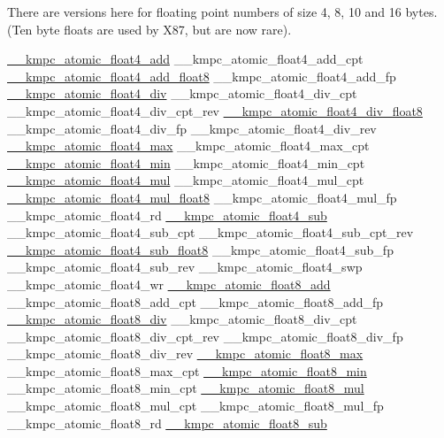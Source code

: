 There are versions here for floating point numbers of size 4, 8, 10 and 16 bytes. (Ten byte floats are used by X87, but are now rare). 
\begin{DoxyCode}
\hyperlink{kmp__atomic_8h_a486e892588a8765e61a869c39abce441}{\_\_kmpc\_atomic\_float4\_add}
\_\_kmpc\_atomic\_float4\_add\_cpt
\hyperlink{kmp__atomic_8h_a59632da2a647b4c6f8590f5bd0d80613}{\_\_kmpc\_atomic\_float4\_add\_float8}
\_\_kmpc\_atomic\_float4\_add\_fp
\hyperlink{kmp__atomic_8h_aed85e1b7130f883d993cdab037efc51d}{\_\_kmpc\_atomic\_float4\_div}
\_\_kmpc\_atomic\_float4\_div\_cpt
\_\_kmpc\_atomic\_float4\_div\_cpt\_rev
\hyperlink{kmp__atomic_8h_a8d63a56b5f7abc38a0b6dfaa315d60bc}{\_\_kmpc\_atomic\_float4\_div\_float8}
\_\_kmpc\_atomic\_float4\_div\_fp
\_\_kmpc\_atomic\_float4\_div\_rev
\hyperlink{kmp__atomic_8h_adb68ad8ccf01bd41f130bc38260454a6}{\_\_kmpc\_atomic\_float4\_max}
\_\_kmpc\_atomic\_float4\_max\_cpt
\hyperlink{kmp__atomic_8h_a416c90256aa4d78b48ccef7ced47b9af}{\_\_kmpc\_atomic\_float4\_min}
\_\_kmpc\_atomic\_float4\_min\_cpt
\hyperlink{kmp__atomic_8h_afddefd621f62ee0ec603031a6a83def4}{\_\_kmpc\_atomic\_float4\_mul}
\_\_kmpc\_atomic\_float4\_mul\_cpt
\hyperlink{kmp__atomic_8h_aa152347bbdc07e4959a9a2a6fc6c6904}{\_\_kmpc\_atomic\_float4\_mul\_float8}
\_\_kmpc\_atomic\_float4\_mul\_fp
\_\_kmpc\_atomic\_float4\_rd
\hyperlink{kmp__atomic_8h_a12d9b6940ecaeba04d2b6648f57ca4fb}{\_\_kmpc\_atomic\_float4\_sub}
\_\_kmpc\_atomic\_float4\_sub\_cpt
\_\_kmpc\_atomic\_float4\_sub\_cpt\_rev
\hyperlink{kmp__atomic_8h_a8fb8b665be66e153854ae703a187f3a3}{\_\_kmpc\_atomic\_float4\_sub\_float8}
\_\_kmpc\_atomic\_float4\_sub\_fp
\_\_kmpc\_atomic\_float4\_sub\_rev
\_\_kmpc\_atomic\_float4\_swp
\_\_kmpc\_atomic\_float4\_wr
\hyperlink{kmp__atomic_8h_ae0b0c600fb7be900dd1c2adff396c4f9}{\_\_kmpc\_atomic\_float8\_add}
\_\_kmpc\_atomic\_float8\_add\_cpt
\_\_kmpc\_atomic\_float8\_add\_fp
\hyperlink{kmp__atomic_8h_a2bfec17c472e75bf4dd06351e128863d}{\_\_kmpc\_atomic\_float8\_div}
\_\_kmpc\_atomic\_float8\_div\_cpt
\_\_kmpc\_atomic\_float8\_div\_cpt\_rev
\_\_kmpc\_atomic\_float8\_div\_fp
\_\_kmpc\_atomic\_float8\_div\_rev
\hyperlink{kmp__atomic_8h_a1ca40ba475fbc83850dd49246b7663ae}{\_\_kmpc\_atomic\_float8\_max}
\_\_kmpc\_atomic\_float8\_max\_cpt
\hyperlink{kmp__atomic_8h_a4447c48168cbb3409a96be59f6bdce26}{\_\_kmpc\_atomic\_float8\_min}
\_\_kmpc\_atomic\_float8\_min\_cpt
\hyperlink{kmp__atomic_8h_a7307faed059b9e1fadcbb6402524d260}{\_\_kmpc\_atomic\_float8\_mul}
\_\_kmpc\_atomic\_float8\_mul\_cpt
\_\_kmpc\_atomic\_float8\_mul\_fp
\_\_kmpc\_atomic\_float8\_rd
\hyperlink{kmp__atomic_8h_a51c989b18ff1a9d09281a00451fdf0b4}{\_\_kmpc\_atomic\_float8\_sub}

\end{DoxyCode}

